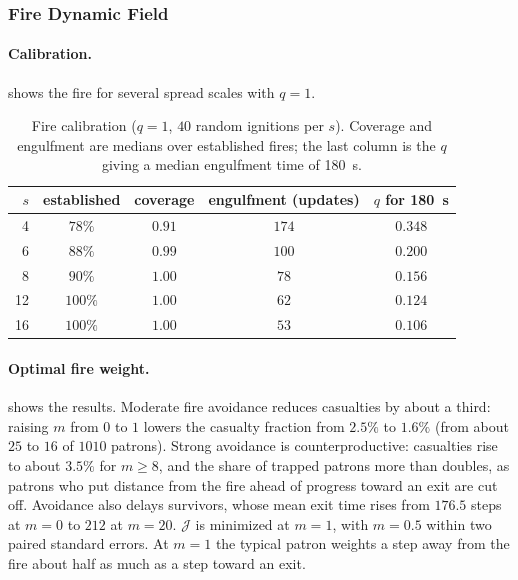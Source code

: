\documentclass[14pt]{article}
\theoremstyle{definition}
\begin{document}
\subsubsection{Fire Dynamic Field}\label{sec:results_fire}
\paragraph{Calibration.}  shows the fire for several spread
scales with $q = 1$.

\begin{table}[H]
  \centering
  \caption{Fire calibration ($q = 1$, $40$ random ignitions per $s$). Coverage and
  engulfment are medians over established fires; the last column is the $q$ giving a
  median engulfment time of \SI{180}{s}.}
  \label{tab:fire_calibration}
  \begin{tabular}{rcccc}
    \toprule
    $s$ & established & coverage & engulfment (updates) & $q$ for \SI{180}{s} \\
    \midrule
    4  & $78\%$  & $0.91$ & $174$ & $0.348$ \\
    6  & $88\%$  & $0.99$ & $100$ & $0.200$ \\
    8  & $90\%$  & $1.00$ & $78$  & $0.156$ \\
    12 & $100\%$ & $1.00$ & $62$  & $0.124$ \\
    16 & $100\%$ & $1.00$ & $53$  & $0.106$ \\
    \bottomrule
  \end{tabular}
\end{table}

\paragraph{Optimal fire weight.}  shows the results. Moderate fire
avoidance reduces casualties by about a third: raising $m$ from $0$ to $1$ lowers the
casualty fraction from $2.5\%$ to $1.6\%$ (from about $25$ to $16$ of $1010$ patrons).
Strong avoidance is counterproductive: casualties rise to about $3.5\%$ for $m \ge 8$,
and the share of trapped patrons more than doubles, as patrons who put distance from the
fire ahead of progress toward an exit are cut off. Avoidance also delays survivors,
whose mean exit time rises from $176.5$ steps at $m = 0$ to $212$ at $m = 20$.
$\mathcal{J}$ is minimized at $m = 1$, with $m = 0.5$ within two paired standard errors.
At $m = 1$ the typical patron weights a step away from the fire about half as much as a
step toward an exit.
\end{document}
